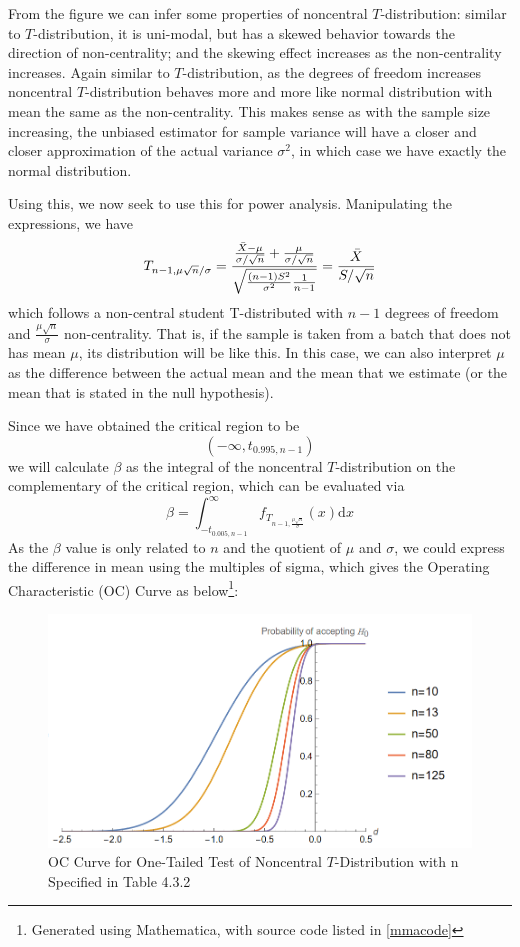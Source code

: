 \documentclass[12pt]{article}
\def\d{\mathrm{d}}
\begin{document}
From the figure we can infer some properties of noncentral $T$-distribution: similar to $T$-distribution, it is uni-modal, but has a skewed behavior towards the direction of non-centrality; and the skewing effect increases as the non-centrality increases. Again similar to $T$-distribution, as the degrees of freedom increases noncentral $T$-distribution behaves more and more like normal distribution with mean the same as the non-centrality. This makes sense as with the sample size increasing, the unbiased estimator for sample variance will have a closer and closer approximation of the actual variance $\sigma^2$, in which case we have exactly the normal distribution.

Using this, we now seek to use this for power analysis. Manipulating the expressions, we have
$$
T_{n-1,\mu\sqrt{n}/\sigma}=\frac{\frac{\Bar{X}-\mu}{\sigma/\sqrt{n}}+\frac{\mu}{\sigma/\sqrt{n}}}{\sqrt{\frac{(n-1)S^2}{\sigma^2}\frac{1}{n-1}}}=\frac{\Bar{X}}{S/\sqrt{n}}
$$
which follows a non-central student T-distributed with $n-1$ degrees of freedom and $\frac{\mu\sqrt{n}}{\sigma}$ non-centrality. That is, if the sample is taken from a batch that does not has mean $\mu$, its distribution will be like this. In this case, we can also interpret $\mu$ as the difference between the actual mean and the mean that we estimate (or the mean that is stated in the null hypothesis).

Since we have obtained the critical region to be
$$
(-\infty, t_{0.995,n-1})
$$
we will calculate $\beta$ as the integral of the noncentral $T$-distribution on the complementary of the critical region, which can be evaluated via
$$
\beta = \int_{-t_{0.005, n-1}}^{\infty} f_{T_{n-1, \frac{\mu\sqrt{n}}{\sigma}}}(x) \d x
$$
As the $\beta$ value is only related to $n$ and the quotient of $\mu$ and $\sigma$, we could express the difference in mean using the multiples of sigma, which gives the Operating Characteristic (OC) Curve as below\footnote{Generated using Mathematica, with source code listed in \ref{mmacode}}:

\begin{figure}[htbp]
    \centering
    \includegraphics[scale=0.6]{img/oc_noncentral_t.png}
    \caption{OC Curve for One-Tailed Test of Noncentral $T$-Distribution with n Specified in Table 4.3.2}
\end{figure}
\end{document}
